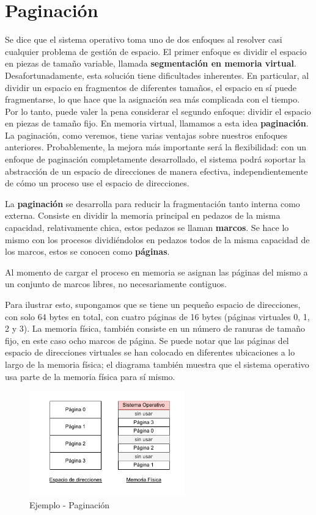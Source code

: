 \documentclass{article}
\begin{document}
\section{Paginación}
Se dice que el sistema operativo toma uno de dos enfoques al resolver casi cualquier problema de gestión de espacio. El primer enfoque es dividir el espacio en piezas de tamaño variable, llamada \textbf{segmentación en memoria virtual}. Desafortunadamente, esta solución tiene dificultades inherentes. En particular, al dividir un espacio en fragmentos de diferentes tamaños, el espacio en sí puede fragmentarse, lo que hace que la asignación sea más complicada con el tiempo. Por lo tanto, puede valer la pena considerar el segundo enfoque: dividir el espacio en piezas de tamaño fijo. En memoria virtual, llamamos a esta idea \textbf{paginación}. La paginación, como veremos, tiene varias ventajas sobre nuestros enfoques anteriores. Probablemente, la mejora más importante será la flexibilidad: con un enfoque de paginación completamente desarrollado, el sistema podrá soportar la abstracción de un espacio de direcciones de manera efectiva, independientemente de cómo un proceso use el espacio de direcciones. 

\begin{definition}
    La \textbf{paginación} se desarrolla para reducir la fragmentación tanto interna como externa. Consiste en dividir la memoria principal en pedazos de la misma capacidad, relativamente chica, estos pedazos se llaman \textbf{marcos}. Se hace lo mismo con los procesos dividiéndolos en pedazos todos de la misma capacidad de los marcos, estos se conocen como \textbf{páginas}.
\end{definition}

Al momento de cargar el proceso en memoria se asignan las páginas del mismo a un conjunto de marcos libres, no necesariamente contiguos.

Para ilustrar esto, supongamos que se tiene un pequeño espacio de direcciones, con solo 64 bytes en total, con cuatro páginas de 16 bytes (páginas virtuales 0, 1, 2 y 3). La memoria física, también consiste en un número de ranuras de tamaño fijo, en este caso ocho marcos de página. Se puede notar que las páginas del espacio de direcciones virtuales se han colocado en diferentes ubicaciones a lo largo de la memoria física; el diagrama también muestra que el sistema operativo usa parte de la memoria física para sí mismo. 

\begin{figure}[h]
    \centering
    \includegraphics[width=0.6\textwidth]{src/paginacion.pdf}
    \caption{Ejemplo - Paginación}
\end{figure}
\end{document}

